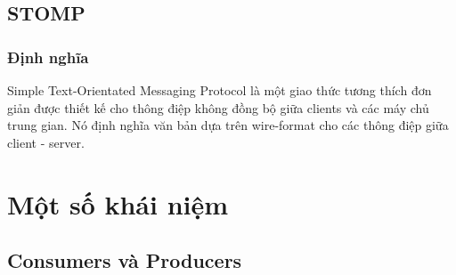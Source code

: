 \subsection{STOMP}
\subsubsection{Định nghĩa}
Simple Text-Orientated Messaging Protocol là một giao thức tương thích đơn giản được thiết kế cho thông điệp không đồng bộ giữa clients và các máy chủ trung gian. Nó định nghĩa văn bản dựa trên wire-format cho các thông điệp giữa client - server.

\section{Một số khái niệm}
\subsection{Consumers và Producers}